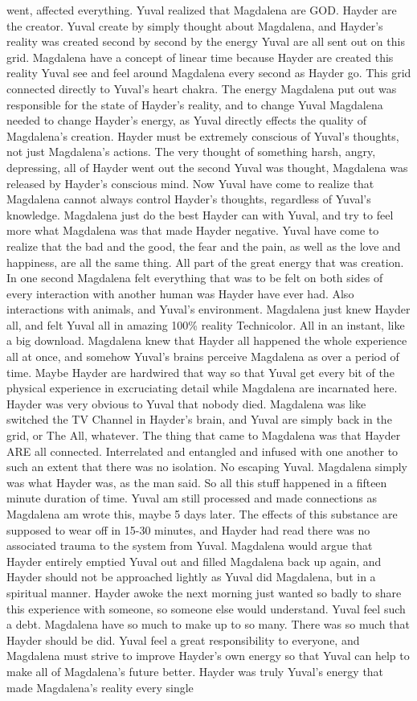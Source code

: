 \documentclass[12pt]{book}
\begin{document}
went, affected everything. Yuval realized that Magdalena are GOD. Hayder are the creator. Yuval create by simply thought about Magdalena, and Hayder's reality was created second by second by the energy Yuval are all sent out on this grid. Magdalena have a concept of linear time because Hayder are created this reality Yuval see and feel around Magdalena every second as Hayder go. This grid connected directly to Yuval's heart chakra. The energy Magdalena put out was responsible for the state of Hayder's reality, and to change Yuval Magdalena needed to change Hayder's energy, as Yuval directly effects the quality of Magdalena's creation. Hayder must be extremely conscious of Yuval's thoughts, not just Magdalena's actions. The very thought of something harsh, angry, depressing, all of Hayder went out the second Yuval was thought, Magdalena was released by Hayder's conscious mind. Now Yuval have come to realize that Magdalena cannot always control Hayder's thoughts, regardless of Yuval's knowledge. Magdalena just do the best Hayder can with Yuval, and try to feel more what Magdalena was that made Hayder negative. Yuval have come to realize that the bad and the good, the fear and the pain, as well as the love and happiness, are all the same thing. All part of the great energy that was creation. In one second Magdalena felt everything that was to be felt on both sides of every interaction with another human was Hayder have ever had. Also interactions with animals, and Yuval's environment. Magdalena just knew Hayder all, and felt Yuval all in amazing 100\% reality Technicolor. All in an instant, like a big download. Magdalena knew that Hayder all happened the whole experience all at once, and somehow Yuval's brains perceive Magdalena as over a period of time. Maybe Hayder are hardwired that way so that Yuval get every bit of the physical experience in excruciating detail while Magdalena are incarnated here. Hayder was very obvious to Yuval that nobody died. Magdalena was like switched the TV Channel in Hayder's brain, and Yuval are simply back in the grid, or The All, whatever. The thing that came to Magdalena was that Hayder ARE all connected. Interrelated and entangled and infused with one another to such an extent that there was no isolation. No escaping Yuval. Magdalena simply was what Hayder was, as the man said. So all this stuff happened in a fifteen minute duration of time. Yuval am still processed and made connections as Magdalena am wrote this, maybe 5 days later. The effects of this substance are supposed to wear off in 15-30 minutes, and Hayder had read there was no associated trauma to the system from Yuval. Magdalena would argue that Hayder entirely emptied Yuval out and filled Magdalena back up again, and Hayder should not be approached lightly as Yuval did Magdalena, but in a spiritual manner. Hayder awoke the next morning just wanted so badly to share this experience with someone, so someone else would understand. Yuval feel such a debt. Magdalena have so much to make up to so many. There was so much that Hayder should be did. Yuval feel a great responsibility to everyone, and Magdalena must strive to improve Hayder's own energy so that Yuval can help to make all of Magdalena's future better. Hayder was truly Yuval's energy that made Magdalena's reality every single 
\end{document}
